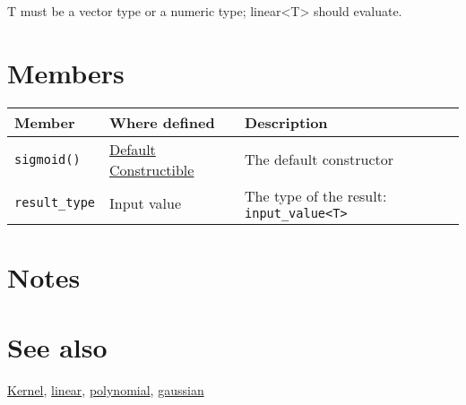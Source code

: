 \documentclass{article}
\begin{document}
T must be a vector type or a numeric type; linear<T> should evaluate.


\section*{Members}

\begin{tabular}{lll}
\textbf{Member} & \textbf{Where defined} & \textbf{Description} \\ 
\hline
\texttt{sigmoid()} & \href{http://www.sgi.com/tech/stl/DefaultConstructible.html}{Default Constructible} & The default constructor \\
\texttt{result_type} & Input value & The type of the result: \texttt{input_value<T>} \\
\end{tabular}

\section*{Notes}

\section*{See also}

\href{\kmlroot/kernel.html}{Kernel},
\href{\kmlroot/linear.html}{linear}, 
\href{\kmlroot/polynomial.html}{polynomial}, 
\href{\kmlroot/gaussian.html}{gaussian}



\end{document}
